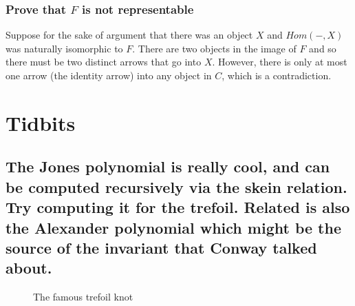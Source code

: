 \documentclass{proc-l}
\theoremstyle{definition}
\theoremstyle{remark}
\numberwithin{equation}{section}
\begin{document}
\subsubsection*{Prove that $F$ is not representable}

Suppose for the sake of argument that there was an object $X$
and $Hom(-, X)$ was naturally isomorphic to $F$.
There are two objects in the image of $F$ and so there must be two distinct arrows that go into $X$.
However, there is only at most one arrow (the identity arrow) into any object in $C$, which is a contradiction.








\section{Tidbits}

\subsection*{The Jones polynomial is really cool, and can be computed recursively via the skein relation. Try computing it for the trefoil. Related is also the Alexander polynomial which might be the source of the invariant that Conway talked about.}

\begin{figure}[h]
\label{trefoilfig}


\caption{The famous trefoil knot}
\end{figure}
\end{document}
